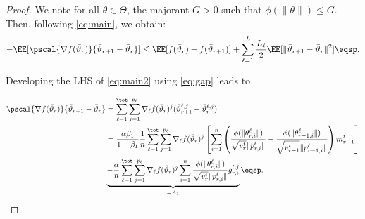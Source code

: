 \documentclass[11pt]{article}
\begin{document}
\begin{proof}
We note for all $\theta \in \Theta$, the majorant $G > 0$ such that $\phi(\|\theta \|) \leq G$. 
Then, following \eqref{eq:main}, we obtain:
\begin{align}\label{eq:main2}
- \EE[  \pscal{\nabla f(\bar{\vartheta}_r)}{\bar{\vartheta}_{r+1} - \bar{\vartheta}_r}]  \leq  \EE[ f(\bar{\vartheta}_r) - f(\bar{\vartheta}_{r+1})] + \sum_{\ell =1}^L \frac{L_\ell}{2} \EE[  \| \bar{\vartheta}_{r+1} - \bar{\vartheta}_r \|^2] \eqsp.
\end{align}

Developing the LHS of \eqref{eq:main2} using \eqref{eq:gap} leads to

\begin{align}\label{eq:inner}
\pscal{\nabla f(\bar{\vartheta}_r)}{\bar{\vartheta}_{r+1} - \bar{\vartheta}_r} &= \sum_{\ell=1}^\tot \sum_{j=1}^{p_\ell} \nabla_{\ell} f(\bar{\vartheta}_r)^j (\bar{\vartheta}^{\ell,j}_{r+1} - \bar{\vartheta}^{\ell,j}_r) \\
& =  \frac{\alpha \beta_1}{1-\beta_1}\frac{1}{n}  \sum_{\ell=1}^\tot \sum_{j=1}^{p_\ell} \nabla_{\ell} f(\bar{\vartheta}_r)^j \left[   \sum_{i = 1}^n  \left( \frac{\phi(\|\theta_{r,i}^{\ell}\|)}{\sqrt{v^{t}_{r}} \|p_{r,i}^{\ell}\|} - \frac{\phi(\|\theta_{r-1,i}^{\ell}\|)}{\sqrt{v^{t}_{r-1}} \|p_{r-1,i}^{\ell}\|} \right) m^{t}_{r-1}  \right] \\
& \underbrace{ -\frac{\alpha}{n} \sum_{\ell=1}^\tot \sum_{j=1}^{p_\ell} \nabla_{\ell} f(\bar{\vartheta}_r)^j  \sum_{i = 1}^n \frac{\phi(\|\theta_{r,i}^{\ell}\|)}{\sqrt{v^{t}_{r}} \|p_{r,i}^{\ell}\|} g_{r,i}^{l,j}}_{= A_1}   \label{eqn1} \eqsp.
\end{align}




\end{proof}
\end{document}
